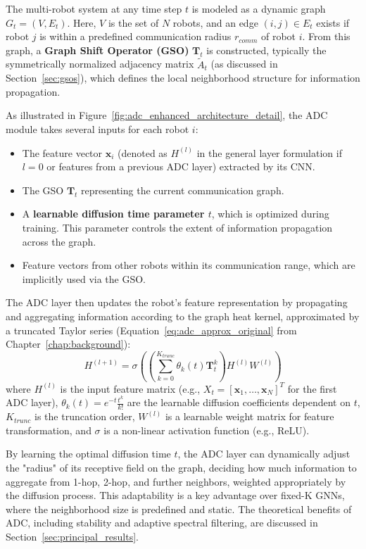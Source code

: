 The multi-robot system at any time step $t$ is modeled as a dynamic graph $G_t = (V, E_t)$. Here, $V$ is the set of $N$ robots, and an edge $(i, j) \in E_t$ exists if robot $j$ is within a predefined communication radius $r_{comm}$ of robot $i$. From this graph, a \textbf{Graph Shift Operator (GSO)} $\mathbf{T}_t$ is constructed, typically the symmetrically normalized adjacency matrix $\tilde{A}_t$ (as discussed in Section~\ref{sec:gsos}), which defines the local neighborhood structure for information propagation.

As illustrated in Figure~\ref{fig:adc_enhanced_architecture_detail}, the ADC module takes several inputs for each robot $i$:
\begin{itemize}
    \item The feature vector $\mathbf{x}_i$ (denoted as $H^{(l)}$ in the general layer formulation if $l=0$ or features from a previous ADC layer) extracted by its CNN.
    \item The GSO $\mathbf{T}_t$ representing the current communication graph.
    \item A \textbf{learnable diffusion time parameter $t$}, which is optimized during training. This parameter controls the extent of information propagation across the graph.
    \item Feature vectors from other robots within its communication range, which are implicitly used via the GSO.
\end{itemize}

The ADC layer then updates the robot's feature representation by propagating and aggregating information according to the graph heat kernel, approximated by a truncated Taylor series (Equation~\ref{eq:adc_approx_original} from Chapter~\ref{chap:background}):
\begin{equation}
H^{(l+1)} = \sigma \left( \left( \sum_{k=0}^{K_{trunc}} \theta_k(t) \mathbf{T}_t^k \right) H^{(l)} W^{(l)} \right)
\end{equation}
where $H^{(l)}$ is the input feature matrix (e.g., $X_t = [\mathbf{x}_1, \dots, \mathbf{x}_N]^T$ for the first ADC layer), $\theta_k(t) = e^{-t} \frac{t^k}{k!}$ are the learnable diffusion coefficients dependent on $t$, $K_{trunc}$ is the truncation order, $W^{(l)}$ is a learnable weight matrix for feature transformation, and $\sigma$ is a non-linear activation function (e.g., ReLU).

By learning the optimal diffusion time $t$, the ADC layer can dynamically adjust the "radius" of its receptive field on the graph, deciding how much information to aggregate from 1-hop, 2-hop, and further neighbors, weighted appropriately by the diffusion process. This adaptability is a key advantage over fixed-K GNNs, where the neighborhood size is predefined and static. The theoretical benefits of ADC, including stability and adaptive spectral filtering, are discussed in Section~\ref{sec:principal_results}.

